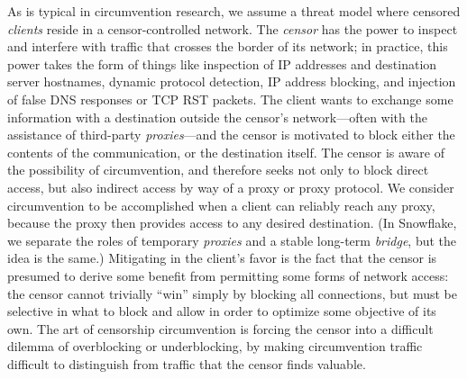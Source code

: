 \documentclass[letterpaper,twocolumn]{article}
\begin{document}
As is typical in circumvention research,
we assume a threat model where
censored \emph{clients} reside in a censor-controlled network.
The \emph{censor} has the power to inspect and interfere with
traffic that crosses the border of its network;
in practice, this power takes the form of things like
inspection of IP addresses and destination server hostnames,
dynamic protocol detection,
IP address blocking, and injection of false DNS responses
or TCP RST packets.
The client wants to exchange some information with a
destination outside the censor's network---often
with the assistance of third-party \emph{proxies}---and
the censor is motivated to block either the contents
of the communication, or the destination itself.
The censor is aware of the possibility of circumvention,
and therefore seeks not only to block direct access,
but also indirect access by way of a proxy or proxy protocol.
We consider circumvention to be accomplished when a client
can reliably reach any proxy,
because the proxy then provides access to any desired destination.
(In Snowflake, we separate the roles of temporary \emph{proxies}
and a stable long-term \emph{bridge}, but the idea is the same.)
Mitigating in the client's favor
is the fact that the censor is presumed to derive some benefit
from permitting some forms of network access:
the censor cannot trivially ``win''
simply by blocking all connections,
but must be selective in what to block and allow
in order to optimize some objective of its own.
The art of censorship circumvention is
forcing the censor into a difficult dilemma
of overblocking or underblocking,
by making circumvention traffic difficult to distinguish
from traffic that the censor finds valuable.
\end{document}

